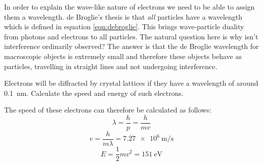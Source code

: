 \documentclass[revision-guide.tex]{subfiles}
\begin{document}
In order to explain the wave-like nature of electrons we need to be able to assign them a wavelength. de Broglie's thesis is that \emph{all} particles have a wavelength which is defined in equation \ref{eqn:debroglie}. This brings wave-particle duality from photons and electrons to all particles. The natural question here is why isn't interference ordinarily observed? The answer is that the de Broglie wavelength for macroscopic objects is extremely small and therefore these objects behave as particles, travelling in straight lines and not undergoing interference.

\begin{example}
Electrons will be diffracted by crystal lattices if they have a wavelength of around \SI{0.1}{\nano\metre}. Calculate the speed and energy of such electrons.

\answer
The speed of these electrons can therefore be calculated as follows:
\[ \lambda = \frac{h}{p} = \frac{h}{mv} \]
\[ v = \frac{h}{m\lambda} = \SI{7.27e6}{\meter\per\second} \]
\[ E = \frac{1}{2}mv^2 = \SI{151}{\electronvolt} \]

\end{example}
\end{document}
